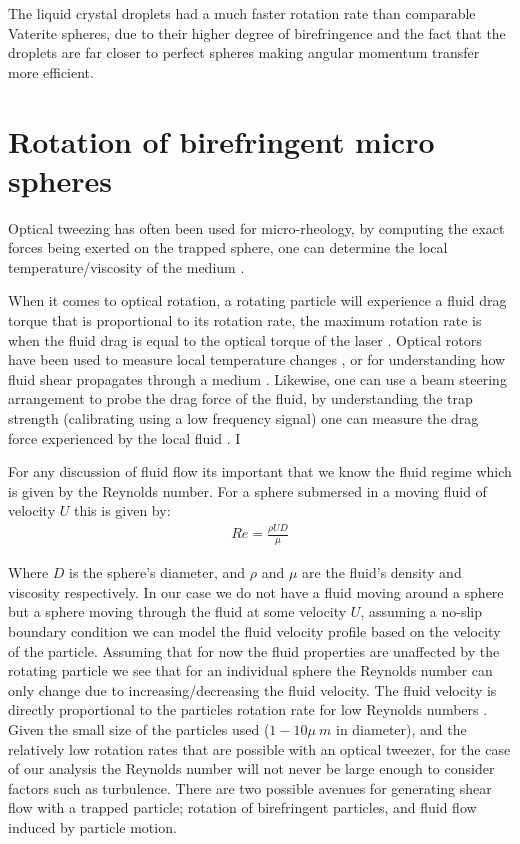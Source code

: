 The liquid crystal droplets had a much faster rotation rate than comparable 
Vaterite spheres, due to their higher degree of birefringence and the fact
that the droplets are far closer to perfect spheres making angular momentum
transfer more efficient. 

\section{Rotation of birefringent micro spheres} 
Optical tweezing has often been used for micro-rheology, by computing the
exact forces being exerted on the trapped sphere, one can determine the
local temperature/viscosity of the medium \cite{Millen2014, RodriguezSevilla2018}.

When it comes to optical rotation, a rotating particle will experience a
fluid drag torque that is proportional to its rotation rate, the maximum 
rotation rate is when the fluid drag is equal to the optical torque 
of the laser \cite{RodriguezSevilla2018}. Optical rotors have been used
to measure local temperature changes \cite{Millen2014}, or for understanding 
how fluid shear propagates through a medium \cite{Knoener2005}. Likewise, 
one can use a beam steering arrangement to probe the drag force of the 
fluid, by understanding the trap strength (calibrating using a low 
frequency signal) one can measure the drag force experienced by the local 
fluid \cite{RobertsonAnderson2018}. I

For any discussion of fluid flow its important that we know the fluid 
regime which is given by the Reynolds number. For a sphere submersed in a 
moving fluid of velocity $U$ this is given by:
\begin{align}
	Re = \frac{\rho UD}{\mu}
\end{align}

Where $D$ is the sphere's diameter, and $\rho$ and $\mu$ are the fluid's 
density and viscosity respectively. In our case we do not have a fluid
moving around a sphere but a sphere moving through the fluid at some 
velocity $U$, assuming a no-slip boundary condition we can model the 
fluid velocity profile based on the velocity of the particle. Assuming
that for now the fluid properties are unaffected by the rotating particle
we see that for an individual sphere the Reynolds number can only change 
due to increasing/decreasing the fluid velocity. The fluid velocity is 
directly proportional to the particles rotation rate for low Reynolds
numbers \cite{Bruce2020}. Given the small size of the particles used 
($1-10\mu\ m$ in diameter), and the relatively low rotation rates that 
are possible with an optical tweezer, for the case of our analysis the
Reynolds number will not never be large enough to consider factors such
as turbulence. There are two possible avenues for generating shear flow 
with a trapped particle; rotation of birefringent particles, and fluid 
flow induced by particle motion. 

